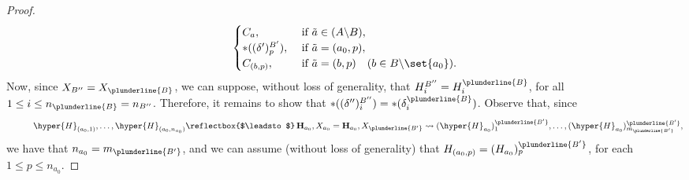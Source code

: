 \begin{proof}
$$\begin{cases}
C_a, & \mbox{ if } \tilde{a}\in (A\backslash {B}),\\
\ast((\delta')^{{B'}}_{p}), & \mbox{ if } \tilde{a}=(a_0,p),\\
C_{(b,p)}, & \mbox{ if } \tilde{a}=(b,p) \quad(b\in {B}\backslash\set{a_0}).
\end{cases}$$
 Now, since $X_{B''}=X_{\plunderline{B}}$, 
we can suppose, without loss of generality, that $H_{i}^{B''}=H^{\plunderline{B}}_{i}$, for all $1\leq i\leq n_{\plunderline{B}}=n_{B''}$. Therefore, it remains to show that $\ast((\delta'')^{B''}_{i})=\ast(\delta_i^{\plunderline{B}})$. Observe that, since $$\quad\quad\quad \hyper{H}_{(a_0,1)},\dots,\hyper{H}_{(a_0,n_{a_0})}\reflectbox{$\leadsto$}\,{\bf H}_{a_0}, X_{a_0}={\bf H}_{a_0}, X_{\plunderline{B'}}\leadsto (\hyper{H}_{a_0})_1^{\plunderline{B'}},\dots,(\hyper{H}_{a_0})^{\plunderline{B'}}_{m_{\plunderline{B'}}},$$
we have that $n_{a_0}=m_{\plunderline{B'}}$, and  we can assume (without loss of generality) that $H_{(a_0,p)}=(H_{a_0})^{\plunderline{B'}}_p$, for each $1\leq p\leq n_{a_0}$.   


\end{proof}
